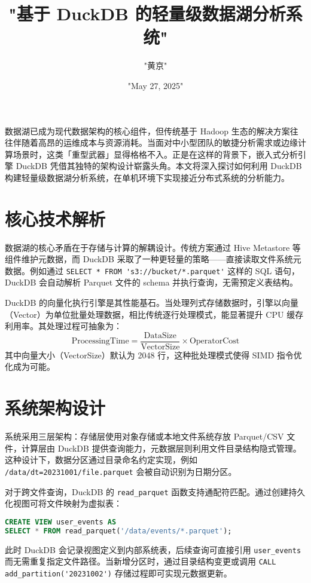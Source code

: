 \title{"基于 DuckDB 的轻量级数据湖分析系统"}
\author{"黄京"}
\date{"May 27, 2025"}
\maketitle
数据湖已成为现代数据架构的核心组件，但传统基于 Hadoop 生态的解决方案往往伴随着高昂的运维成本与资源消耗。当面对中小型团队的敏捷分析需求或边缘计算场景时，这类「重型武器」显得格格不入。正是在这样的背景下，嵌入式分析引擎 DuckDB 凭借其独特的架构设计崭露头角。本文将深入探讨如何利用 DuckDB 构建轻量级数据湖分析系统，在单机环境下实现接近分布式系统的分析能力。\par
\chapter{核心技术解析}
数据湖的核心矛盾在于存储与计算的解耦设计。传统方案通过 Hive Metastore 等组件维护元数据，而 DuckDB 采取了一种更轻量的策略——直接读取文件系统元数据。例如通过 \verb!SELECT * FROM 's3://bucket/*.parquet'! 这样的 SQL 语句，DuckDB 会自动解析 Parquet 文件的 schema 并执行查询，无需预定义表结构。\par
DuckDB 的向量化执行引擎是其性能基石。当处理列式存储数据时，引擎以向量（Vector）为单位批量处理数据，相比传统逐行处理模式，能显著提升 CPU 缓存利用率。其处理过程可抽象为：
$$ \text{ProcessingTime} = \frac{\text{DataSize}}{\text{VectorSize}} \times \text{OperatorCost} $$
其中向量大小（VectorSize）默认为 2048 行，这种批处理模式使得 SIMD 指令优化成为可能。\par
\chapter{系统架构设计}
系统采用三层架构：存储层使用对象存储或本地文件系统存放 Parquet/CSV 文件，计算层由 DuckDB 提供查询能力，元数据层则利用文件目录结构隐式管理。这种设计下，数据分区通过目录命名约定实现，例如 \verb!/data/dt=20231001/file.parquet! 会被自动识别为日期分区。\par
对于跨文件查询，DuckDB 的 \verb!read_parquet! 函数支持通配符匹配。通过创建持久化视图可将文件映射为虚拟表：\par
\begin{lstlisting}[language=sql]
CREATE VIEW user_events AS 
SELECT * FROM read_parquet('/data/events/*.parquet');
\end{lstlisting}
此时 DuckDB 会记录视图定义到内部系统表，后续查询可直接引用 \verb!user_events! 而无需重复指定文件路径。当新增分区时，通过目录结构变更或调用 \verb!CALL add_partition('20231002')! 存储过程即可实现元数据更新。\par
